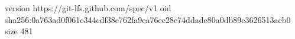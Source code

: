 version https://git-lfs.github.com/spec/v1
oid sha256:0a763ad0f061c344cdf38e762fa9ea76ec28e74ddade80a0db89c3626513acb0
size 481
